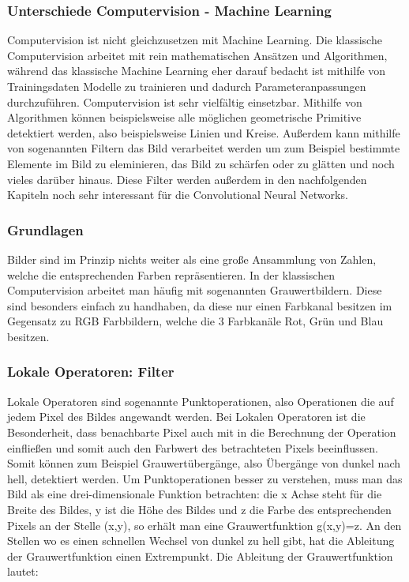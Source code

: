 \documentclass[11pt, a4paper]{article}
\begin{document}
\subsubsection{Unterschiede Computervision - Machine Learning}
Computervision ist nicht gleichzusetzen mit Machine Learning. Die klassische Computervision arbeitet mit rein mathematischen Ansätzen und Algorithmen, während das klassische Machine Learning eher darauf bedacht ist mithilfe von Trainingsdaten Modelle zu trainieren und dadurch Parameteranpassungen durchzuführen. Computervision ist sehr vielfältig einsetzbar. Mithilfe von Algorithmen können beispielsweise alle möglichen geometrische Primitive detektiert werden, also beispielsweise Linien und Kreise. Außerdem kann mithilfe von sogenannten Filtern das Bild verarbeitet werden um zum Beispiel bestimmte Elemente im Bild zu eleminieren, das Bild zu schärfen oder zu glätten und noch vieles darüber hinaus. Diese Filter werden außerdem in den nachfolgenden Kapiteln noch sehr interessant für die Convolutional Neural Networks.

\subsubsection{Grundlagen}
Bilder sind im Prinzip nichts weiter als eine große Ansammlung von Zahlen, welche die entsprechenden Farben repräsentieren. In der klassischen Computervision arbeitet man häufig mit sogenannten Grauwertbildern. Diese sind besonders einfach zu handhaben, da diese nur einen Farbkanal besitzen im Gegensatz zu RGB Farbbildern, welche die 3 Farbkanäle Rot, Grün und Blau besitzen.

\subsubsection{Lokale Operatoren: Filter}
Lokale Operatoren sind sogenannte Punktoperationen, also Operationen die auf jedem Pixel des Bildes angewandt werden. Bei Lokalen Operatoren ist die Besonderheit, dass benachbarte Pixel auch mit in die Berechnung der Operation einfließen und somit auch den Farbwert des betrachteten Pixels beeinflussen. Somit können zum Beispiel Grauwertübergänge, also Übergänge von dunkel nach hell, detektiert werden. Um Punktoperationen besser zu verstehen, muss man das Bild als eine drei-dimensionale Funktion betrachten: die x Achse steht für die Breite des Bildes, y ist die Höhe des Bildes und z die Farbe des entsprechenden Pixels an der Stelle (x,y), so erhält man eine Grauwertfunktion g(x,y)=z. An den Stellen wo es einen schnellen Wechsel von dunkel zu hell gibt, hat die Ableitung der Grauwertfunktion einen Extrempunkt. Die Ableitung der Grauwertfunktion lautet:
\newline
\end{document}
